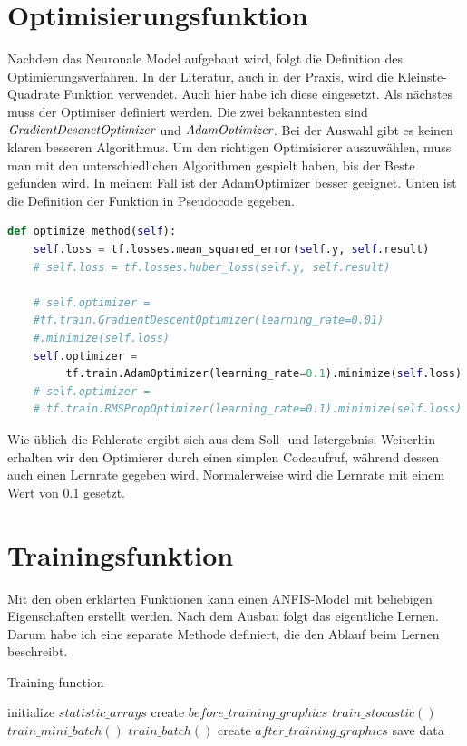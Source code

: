 \section{Optimisierungsfunktion}\label{optimisierungsfunktion}

Nachdem das Neuronale Model aufgebaut wird, folgt die Definition des Optimierungsverfahren. In der Literatur, auch in der Praxis, wird die Kleinste-Quadrate Funktion verwendet. Auch hier habe ich diese eingesetzt. Als nächstes muss der Optimiser definiert werden. Die zwei bekanntesten sind $\emph{GradientDescnetOptimizer}$ und $\emph{AdamOptimizer}$. Bei der Auswahl gibt es keinen klaren besseren Algorithmus. Um den richtigen Optimisierer auszuwählen, muss man mit den unterschiedlichen Algorithmen gespielt haben, bis der Beste gefunden wird. In meinem Fall ist der AdamOptimizer besser geeignet. Unten ist die Definition der Funktion in Pseudocode gegeben.

\begin{lstlisting}[language=Python]
def optimize_method(self):
	self.loss = tf.losses.mean_squared_error(self.y, self.result)
	# self.loss = tf.losses.huber_loss(self.y, self.result)
	
	# self.optimizer =  
	#tf.train.GradientDescentOptimizer(learning_rate=0.01)
	#.minimize(self.loss)
	self.optimizer =
		 tf.train.AdamOptimizer(learning_rate=0.1).minimize(self.loss)
	# self.optimizer =
	# tf.train.RMSPropOptimizer(learning_rate=0.1).minimize(self.loss)
\end{lstlisting}
 
Wie üblich die Fehlerate ergibt sich aus dem Soll- und Istergebnis.
Weiterhin erhalten wir den Optimierer durch einen simplen Codeaufruf,
während dessen auch einen Lernrate gegeben wird. Normalerweise wird die
Lernrate mit einem Wert von 0.1 gesetzt.


\section{Trainingsfunktion}\label{trainingsfunktion}

Mit den oben erklärten Funktionen kann einen ANFIS-Model mit beliebigen
Eigenschaften erstellt werden. Nach dem Ausbau folgt das eigentliche
Lernen. Darum habe ich eine separate Methode definiert, die den Ablauf
beim Lernen beschreibt.
%	

\begin{algorithm}
	\caption{Training function}
	\begin{algorithmic}[1]
		\REQUIRE initialize $statistic\_arrays$
		\STATE create $before\_training\_graphics$
			\STATE $train\_stocastic()$
			\STATE $train\_mini\_batch()$
		\ELSE
			\STATE $train\_batch()$
		\ENDIF
		\STATE create $after\_training\_graphics$
		\STATE save data
	\end{algorithmic}
\end{algorithm}

